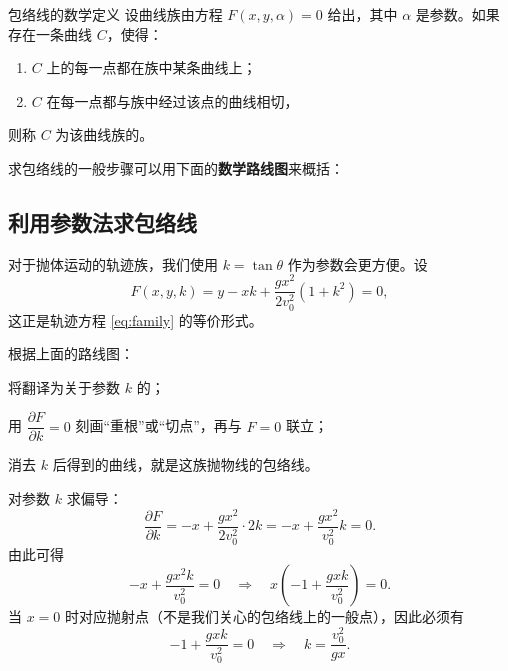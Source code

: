\documentclass[a4paper,11pt]{ctexart}
\begin{document}
\begin{definitionbox}{包络线的数学定义}
设曲线族由方程 $F(x, y, \alpha) = 0$ 给出，其中 $\alpha$ 是参数。如果存在一条曲线 $C$，使得：
\begin{enumerate}
    \item $C$ 上的每一点都在族中某条曲线上；
    \item $C$ 在每一点都与族中经过该点的曲线相切，
\end{enumerate}
则称 $C$ 为该曲线族的。

求包络线的一般步骤可以用下面的\textbf{数学路线图}来概括：

\begin{roadmap}
\end{roadmap}
\end{definitionbox}

\subsection{利用参数法求包络线}

对于抛体运动的轨迹族，我们使用 $k = \tan\theta$ 作为参数会更方便。设
\[
  F(x,y,k) = y - xk + \frac{gx^2}{2v_0^2}(1 + k^2) = 0, \label{eq:F}
\]
这正是轨迹方程 \eqref{eq:family} 的等价形式。

根据上面的路线图：
\begin{focuspoints}
  \item 将翻译为关于参数 $k$ 的；
  \item 用 $\dfrac{\partial F}{\partial k}=0$ 刻画“重根”或“切点”，再与 $F=0$ 联立；
  \item 消去 $k$ 后得到的曲线，就是这族抛物线的包络线。
\end{focuspoints}

对参数 $k$ 求偏导：
\[
  \frac{\partial F}{\partial k} = -x + \frac{gx^2}{2v_0^2} \cdot 2k
  = -x + \frac{gx^2}{v_0^2}k = 0.
\]
由此可得
\[
  -x + \frac{gx^2k}{v_0^2} = 0
  \quad\Longrightarrow\quad
  x\!\left(-1 + \frac{gxk}{v_0^2}\right) = 0.
\]
当 $x = 0$ 时对应抛射点（不是我们关心的包络线上的一般点），因此必须有
\[
  -1 + \frac{gxk}{v_0^2} = 0
  \quad\Longrightarrow\quad
  k = \frac{v_0^2}{gx}. \label{eq:k}
\]
\end{document}
